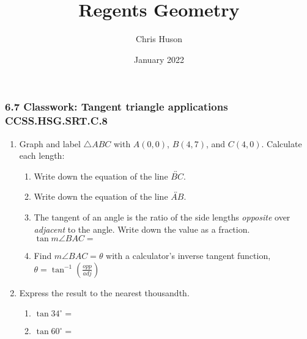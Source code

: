 \documentclass[12pt, twoside]{article}
\title{Regents Geometry}
\author{Chris Huson}
\date{January 2022}
\begin{document}
\subsubsection*{6.7 Classwork: Tangent triangle applications \hfill CCSS.HSG.SRT.C.8}
\begin{enumerate}
\item Graph and label $\triangle ABC$ with $A(0,0)$, $B(4,7)$, and $C(4,0)$. Calculate each length:
  \begin{enumerate}[itemsep=1.5cm]
    \item Write down the equation of the line $\overleftrightarrow{BC}$.
    \item Write down the equation of the line $\overleftrightarrow{AB}$. 
    \item The tangent of an angle is the ratio of the side lengths \emph{opposite} over \emph{adjacent} to the angle. Write down the value as a fraction. \\[0.5cm]
      $\tan m \angle BAC=$
    \item Find $m\angle BAC=\theta$ with a calculator's inverse tangent function, $\displaystyle \theta = \tan^{-1}(\frac{opp}{adj})$
    \vspace{2cm}
  \end{enumerate}

\newpage
\item Express the result to the nearest thousandth.  \vspace{.5cm}
  \begin{multicols}{2}
    \begin{enumerate}
      \item $\tan 34^\circ = $ \vspace{1cm}
      \item $\tan 60^\circ =$
    \end{enumerate}
  \end{multicols} \vspace{1cm}


\end{enumerate}
\end{document}

